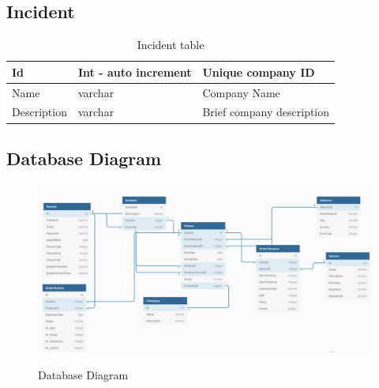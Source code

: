 \subsection{Incident}
\begin{table}[!ht]
\begin{center}
\begin{tabular}{ |l|l|l| } 
 \hline
Id & Int - auto increment & Unique company ID \\
 \hline
Name & varchar & Company Name \\
 \hline
Description & varchar & Brief company description \\
 \hline
\end{tabular}
\end{center}
    \caption{Incident table}
\end{table}

\subsection{Database Diagram}
\begin{figure}[!ht]
	\centering
	\includegraphics[width=1\textwidth]{images/IOSLDBDiagramlatex.png}\\
	\caption{Database Diagram}
	\label{fig:Database Diagram}
\end{figure}
